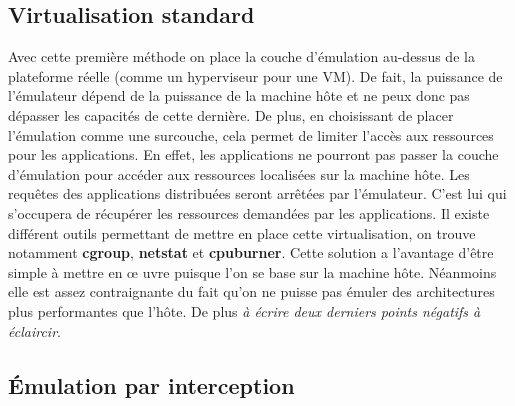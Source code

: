 \subsection{Virtualisation standard}
\label{section:limitation}

Avec cette première méthode on place la couche d'émulation au-dessus de la
plateforme réelle (comme un hyperviseur pour une VM). De fait, la puissance de
l'émulateur dépend de la puissance de la machine hôte et ne peux donc pas
dépasser les capacités de cette dernière. De plus, en choisissant de placer
l'émulation comme une surcouche, cela permet de limiter l'accès aux ressources
pour les applications. En effet, les applications ne pourront pas passer la
couche d'émulation pour accéder aux ressources localisées sur la machine
hôte. Les requêtes des applications distribuées seront arrêtées par
l'émulateur. C'est lui qui s'occupera de récupérer les ressources demandées par
les applications. Il existe différent outils permettant de mettre en place cette
virtualisation, on trouve notamment \textbf{cgroup}, \textbf{netstat} et
\textbf{cpuburner}.  Cette solution a l'avantage d'être simple à mettre en \oe
uvre puisque l'on se base sur la machine hôte. Néanmoins elle est assez
contraignante du fait qu'on ne puisse pas émuler des architectures plus
performantes que l'hôte. De plus {\color{red} \textit{à écrire deux derniers
    points négatifs à éclaircir}}.

\subsection{Émulation par interception}

